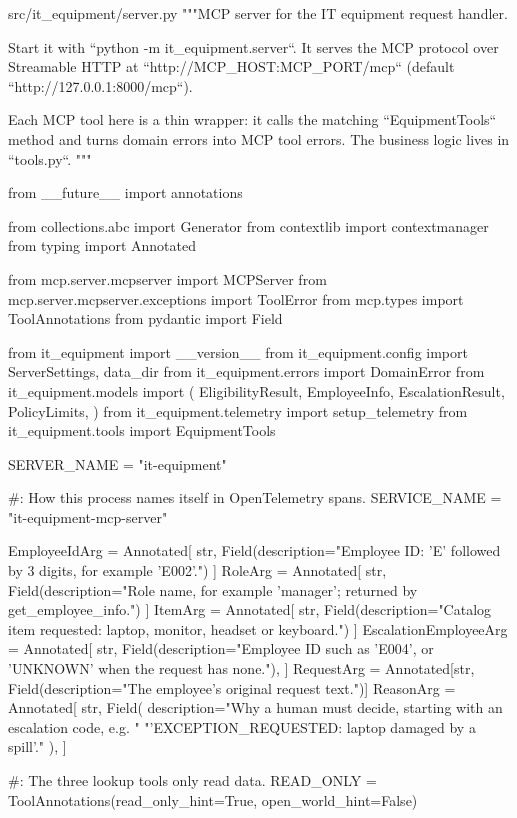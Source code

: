 \documentclass[11pt,letterpaper]{article}
\renewcommand{\_}{\textunderscore\allowbreak}
\begin{document}
\begin{codebox}{src/it_equipment/server.py}
"""MCP server for the IT equipment request handler.

Start it with ``python -m it_equipment.server``. It serves the MCP protocol over Streamable
HTTP at ``http://MCP_HOST:MCP_PORT/mcp`` (default ``http://127.0.0.1:8000/mcp``).

Each MCP tool here is a thin wrapper: it calls the matching ``EquipmentTools`` method and
turns domain errors into MCP tool errors. The business logic lives in ``tools.py``.
"""

from __future__ import annotations

from collections.abc import Generator
from contextlib import contextmanager
from typing import Annotated

from mcp.server.mcpserver import MCPServer
from mcp.server.mcpserver.exceptions import ToolError
from mcp.types import ToolAnnotations
from pydantic import Field

from it_equipment import __version__
from it_equipment.config import ServerSettings, data_dir
from it_equipment.errors import DomainError
from it_equipment.models import (
    EligibilityResult,
    EmployeeInfo,
    EscalationResult,
    PolicyLimits,
)
from it_equipment.telemetry import setup_telemetry
from it_equipment.tools import EquipmentTools

SERVER_NAME = "it-equipment"

#: How this process names itself in OpenTelemetry spans.
SERVICE_NAME = "it-equipment-mcp-server"

EmployeeIdArg = Annotated[
    str, Field(description="Employee ID: 'E' followed by 3 digits, for example 'E002'.")
]
RoleArg = Annotated[
    str, Field(description="Role name, for example 'manager'; returned by get_employee_info.")
]
ItemArg = Annotated[
    str, Field(description="Catalog item requested: laptop, monitor, headset or keyboard.")
]
EscalationEmployeeArg = Annotated[
    str,
    Field(description="Employee ID such as 'E004', or 'UNKNOWN' when the request has none."),
]
RequestArg = Annotated[str, Field(description="The employee's original request text.")]
ReasonArg = Annotated[
    str,
    Field(
        description="Why a human must decide, starting with an escalation code, e.g. "
        "'EXCEPTION_REQUESTED: laptop damaged by a spill'."
    ),
]

#: The three lookup tools only read data.
READ_ONLY = ToolAnnotations(read_only_hint=True, open_world_hint=False)


\end{codebox}
\end{document}
